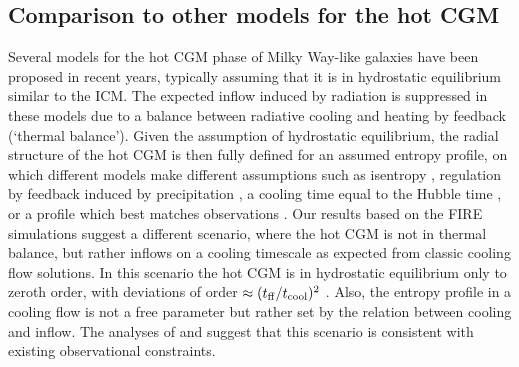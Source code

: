 \documentclass[fleqn,usenatbib]{mnras}
\begin{document}


\subsection{Comparison to other models for the hot CGM}

Several models for the hot CGM phase of Milky Way-like galaxies have been proposed in recent years, typically assuming that it is in hydrostatic equilibrium similar to the ICM. The expected inflow induced by radiation is suppressed in these models due to a balance between radiative cooling and heating by feedback (`thermal balance'). Given the assumption of hydrostatic equilibrium, the radial structure of the hot CGM is then fully defined for an assumed entropy profile, on which different models make different assumptions such as isentropy \citep{Faerman2020}, regulation by feedback induced by precipitation \citep[e.g.,][]{Sharma2012, Voit2017}, a cooling time equal to the Hubble time \citep{Maller2004}, or a profile which best matches observations \citep{Faerman2017}. Our results based on the FIRE simulations suggest a different scenario, where the hot CGM is not in  thermal balance, but rather inflows on a cooling timescale as expected from classic cooling flow solutions. In this scenario the hot CGM is in hydrostatic equilibrium only to zeroth order, with deviations of order $\approx(t_{\rm ff}/t_{\rm cool})^2$ \citep{Stern2019}. Also, the entropy profile in a cooling flow is not a free parameter but rather set by the relation between cooling and inflow. The analyses \cite{Qu2018} of \cite{Stern2019} and suggest that this scenario is consistent with existing observational constraints. 
\end{document}
